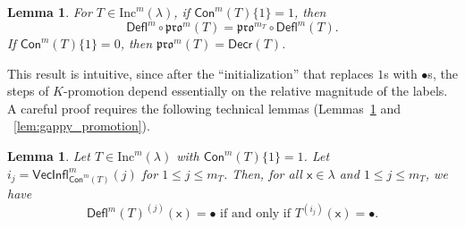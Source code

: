 \documentclass[12pt]{amsart}
\newcommand{\x}{\ensuremath{\mathsf{x}}}
\newtheorem{lemma}[theorem]{Lemma}
\theoremstyle{definition}
\theoremstyle{remark}
\numberwithin{equation}{section}
\newcommand{\inc}{\ensuremath{\mathrm{Inc}}}
\newcommand{\pro}{\mathfrak{pro}}
\newcommand{\decr}{\ensuremath{\mathsf{Decr}}}
\newcommand{\deflate}{\ensuremath{\mathsf{Defl}}}
\newcommand{\inflate}{\ensuremath{\mathsf{VecInfl}}}
\newcommand{\content}{\ensuremath{\mathsf{Con}}}
\begin{document}
\begin{lemma}\label{lem:deflation_commutation}
For $T \in \inc^m(\lambda)$, if $\content^m(T) \lbrace 1 \rbrace = 1$, then
\begin{equation}\label{eq:deflation_commutation}
\deflate^m \circ \pro^m(T) = \pro^{m_T} \circ \deflate^m(T).
\end{equation}
If $\content^m(T) \lbrace 1 \rbrace = 0$, then $\pro^m(T) = \decr(T)$. 
\end{lemma} 
This result is intuitive, since after the ``initialization'' that replaces $1$s with $\bullet$s, the steps of $K$-promotion depend essentially on the relative magnitude of the labels. A careful proof requires the following technical lemmas (Lemmas~\ref{lem:bullet_placement} and ~\ref{lem:gappy_promotion}). 
\begin{lemma} \label{lem:bullet_placement}
Let $T \in \inc^m(\lambda)$ with $\content^m(T) \lbrace 1 \rbrace = 1$. Let $i_j = \inflate^m_{\content^m(T)}(j)$ for $1 \leq j \leq m_T$. Then, for all $\x \in \lambda$ and $1 \leq j \leq m_T$, we have
 \begin{equation}\label{eq:gappy_promotion2}
\deflate^m(T)^{(j)}(\x) = \bullet \text{ if and only if } T^{(i_j)}(\x) = \bullet.
\end{equation}
\end{lemma}
\end{document}
